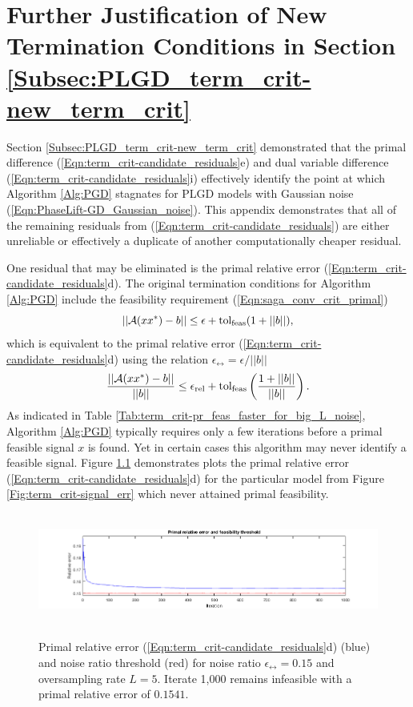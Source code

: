 \chapter{Further Justification of New Termination Conditions in Section \ref{Subsec:PLGD_term_crit-new_term_crit}}      		\label{Sec:Appx-further_reasons_for_new_term_crit}



Section \ref{Subsec:PLGD_term_crit-new_term_crit} demonstrated that the primal difference (\ref{Eqn:term_crit-candidate_residuals}e) and dual variable difference (\ref{Eqn:term_crit-candidate_residuals}i) effectively identify the point at which Algorithm \ref{Alg:PGD} stagnates for PLGD models with Gaussian noise (\ref{Eqn:PhaseLift-GD_Gaussian_noise}).  
This appendix demonstrates that all of the remaining residuals from  (\ref{Eqn:term_crit-candidate_residuals}) are either unreliable or effectively a duplicate of another computationally cheaper residual.  

One residual that may be eliminated is the primal relative error (\ref{Eqn:term_crit-candidate_residuals}d).  The original termination conditions for Algorithm \ref{Alg:PGD} include the feasibility requirement (\ref{Eqn:saga_conv_crit_primal}) 
\begin{equation*}
|| {\mathcal A}(xx^*) - b || \leq \epsilon + \textnormal{tol}_\textnormal{feas} (1 + ||b||),
\end{equation*}
which is equivalent to the primal relative error (\ref{Eqn:term_crit-candidate_residuals}d) using the relation $\epsilon_\rel = \epsilon / ||b||$
\begin{equation}
	\label{Eqn:GD_new_termination_conds-primal_feas}
\frac{||{\mathcal A}(xx^*) - b||}{||b||}  \leq \epsilon_{\textnormal{rel}} + \textnormal{tol}_\textnormal{feas} \left(\frac{1 + ||b||}{||b||}\right).
\end{equation}
As indicated in Table \ref{Tab:term_crit-pr_feas_faster_for_big_L_noise}, Algorithm \ref{Alg:PGD} typically requires only a few iterations before a primal feasible signal $x$ is found.  Yet in certain cases this algorithm may never identify a feasible signal.  Figure \ref{Fig:term_crit-pr_err_fails} demonstrates plots the primal relative error (\ref{Eqn:term_crit-candidate_residuals}d) for the particular model from Figure \ref{Fig:term_crit-signal_err} which never attained primal feasibility.

\begin{figure}[H]
\centering
\hbox{\hspace{-1.0cm} \includegraphics[scale=0.6]{term_crit-pr_err_fails} }
\caption{Primal relative error (\ref{Eqn:term_crit-candidate_residuals}d) (blue) and noise ratio threshold (red) for noise ratio $\epsilon_\rel = 0.15$ and oversampling rate $L = 5$.  Iterate 1,000 remains infeasible with a primal relative error of $0.1541$.}
\label{Fig:term_crit-pr_err_fails}
\end{figure}

